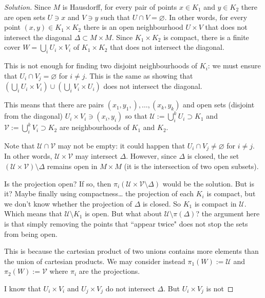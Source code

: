 \begin{proof}[Solution]\leavevmode
Since \(M\) is Hausdorff, for every pair of points \(x \in K_1\) and \(y \in K_2\) there are open sets \(U \ni x\) and \(V \ni y\) such that \(U \cap V= \varnothing\). In other words, for every point \((x,y) \in K_1 \times K_2\) there is an open neighbourhood \(U\times V\) that does not intersect the diagonal \(\Delta \subset M \times M\). Since \(K_1 \times K_2\) is compact, there is a finite cover \(W= \bigcup_{i} U_i \times V_i\) of \(K_1 \times K_2\) that does not intersect the diagonal.

This is not enough for finding two disjoint neighbourhoods of \(K_i\): we must ensure that \(U_i \cap V_j=\varnothing\) for \(i \neq  j\). This is the same as showing that \(\left(\bigcup_{i} U_i \times V_i\right)\cup \left( \bigcup_{i} V_i \times U_i \right) \) does not intersect the diagonal.

This means that there are pairs \((x_1,y_1,),\ldots,(x_k,y_k)\) and open sets (disjoint from the diagonal) \(U_i\times V_i \ni (x_i,y_i)\) so that \(\mathcal{U}:=\bigcup_{i}^k U_i \supset K_1\) and  \(\mathcal{V}:=\bigcup_{i}^k V_i\supset K_2\) are neighbourhoods of \(K_1\) and \(K_2\).

Note that \(\mathcal{U} \cap \mathcal{V}\) may not be empty: it could happen that \(U_i \cap V_j \neq  \varnothing\) for \(i \neq  j\). In other words, \(\mathcal{U} \times \mathcal{V}\) may intersect \(\Delta\). However, since \(\Delta\) is closed, the set \((\mathcal{U}\times \mathcal{V})\setminus\Delta\) remains open in \(M \times M\) (it is the intersection of two open subsets).

Is the projection open? If so, then \(\pi_i(\mathcal{U} \times \mathcal{V} \setminus \Delta)\) would be the solution. But is it? Maybe finally using compactness… the projection of each \(K_i\) is compact, but we don't know whether the projection of \(\Delta\) is closed. So \(K_1\) is compact in \(\mathcal{U}\). Which means that \(\mathcal{U}\setminus K_1\) is open. But what about \(\mathcal{U} \setminus\pi(\Delta)\)? {\color{6}the argument here is that simply removing the points that ``appear twice" does not stop the sets from being open.}


This is because the cartesian product of two unions contains more elements than the union of cartesian products. We may consider instead \(\pi_1(W):= \mathcal{U}\) and \(\pi_2(W):= \mathcal{V}\) where \(\pi_i\) are the projections.

I know that \(U_i \times V_i\) and \(U_j \times V_j\) do not intersect \(\Delta\). But \(U_i \times V_j\) is not


\end{proof}
